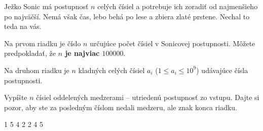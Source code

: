 




Ježko Sonic má postupnosť $n$ celých čísiel a potrebuje ich zoradiť od najmenšieho po najväčší. Nemá
však čas, lebo behá po lese a zbiera zlaté prstene. Nechal to teda na vás.


Na prvom riadku je číslo $n$ určujúce počet čísiel v Sonicovej postupnosti. Môžete predpokladať, že
\textbf{$n$ je najviac $100000$}.

Na druhom riadku je $n$ kladných celých čísiel $a_i$ ($1 \leq a_i \leq 10^9$) udávajúce čísla
postupnosti.


Vypíšte $n$ čísiel oddelených medzerami -- utriedenú postupnosť zo vstupu. Dajte si pozor, aby ste
za posledným číslom nedali medzeru, ale znak konca riadku.


1 5 4 2
 2 4 5
\koniec


